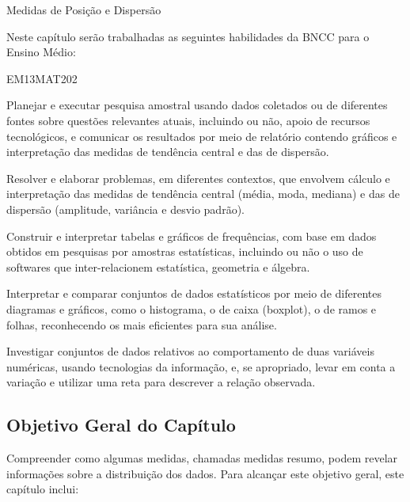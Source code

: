 \mainmatter

\begin{apresentacao}{Medidas de Posição e Dispersão}

Neste capítulo serão trabalhadas as seguintes habilidades da BNCC para o Ensino Médio:

\begin{habilities}{EM13MAT202}

Planejar e executar pesquisa amostral usando dados coletados ou de diferentes fontes sobre questões relevantes atuais, incluindo ou não, apoio de recursos tecnológicos, e comunicar os resultados por meio de relatório contendo gráficos e interpretação das medidas de tendência central e das de dispersão.

 Resolver e elaborar problemas, em diferentes contextos, que envolvem cálculo e interpretação das medidas de tendência central (média, moda, mediana) e das de dispersão (amplitude, variância e desvio padrão).

 Construir e interpretar tabelas e gráficos de frequências, com base em dados obtidos em pesquisas por amostras estatísticas, incluindo ou não o uso de softwares que inter-relacionem estatística, geometria e álgebra.

 Interpretar e comparar conjuntos de dados estatísticos por meio de diferentes diagramas e gráficos, como o histograma, o de caixa (boxplot), o de ramos e folhas, reconhecendo os mais eficientes para sua análise.

 Investigar conjuntos de dados relativos ao comportamento de duas variáveis numéricas, usando tecnologias da informação, e, se apropriado, levar em conta a variação e utilizar uma reta para descrever a relação observada.
\end{habilities}

\subsection{Objetivo Geral do Capítulo}

Compreender como algumas medidas, chamadas medidas resumo, podem revelar informações sobre a distribuição dos dados. Para alcançar este objetivo geral, este capítulo inclui:


\end{apresentacao}
